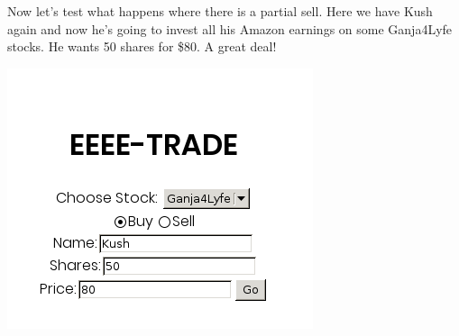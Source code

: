 Now let's test what happens where there is a partial sell. Here we have Kush again and now he's going to invest all his Amazon earnings on some Ganja4\+Lyfe stocks. He wants 50 shares for \$80. A great deal!

 
\includegraphics[scale=1.0]{../test11.png}
 